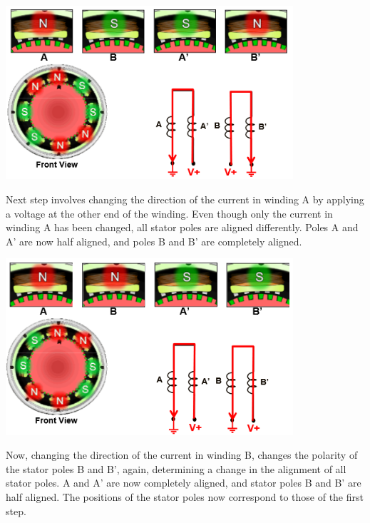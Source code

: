 \begin{center}
	\includegraphics[width=0.8\textwidth]{figures/move/motor33}
	\label{fig:hybrid_second_step}
\end{center}

Next step involves changing the direction of the current in winding A by applying a voltage at the other end of the winding. Even though only the current in winding A has been changed, all stator poles are aligned differently. Poles A and A’ are now half aligned, and poles B and B’ are completely aligned.

\begin{center}
	\includegraphics[width=0.8\textwidth]{figures/move/motor34}
	\label{fig:hybrid_third_step}
\end{center}
\newpage
Now, changing the direction of the current in winding B, changes the polarity of the stator poles B and B', again, determining a change in the alignment of all stator poles. A and A’ are now completely aligned, and stator poles B and B’ are half aligned. The positions of the stator poles now correspond to those of the first step.

